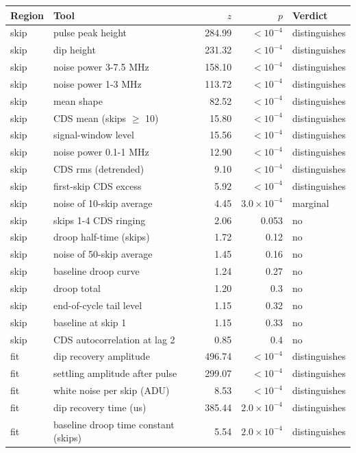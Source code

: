 \documentclass[11pt]{article}
\begin{document}
\begin{center}
\small
\begin{tabular}{llrrl}
\toprule
Region & Tool & $z$ & $p$ & Verdict \\
\midrule
skip & pulse peak height & 284.99 & $<10^{-4}$ & distinguishes \\
skip & dip height & 231.32 & $<10^{-4}$ & distinguishes \\
skip & noise power 3-7.5 MHz & 158.10 & $<10^{-4}$ & distinguishes \\
skip & noise power 1-3 MHz & 113.72 & $<10^{-4}$ & distinguishes \\
skip & mean shape & 82.52 & $<10^{-4}$ & distinguishes \\
skip & CDS mean (skips $\ge$ 10) & 15.80 & $<10^{-4}$ & distinguishes \\
skip & signal-window level & 15.56 & $<10^{-4}$ & distinguishes \\
skip & noise power 0.1-1 MHz & 12.90 & $<10^{-4}$ & distinguishes \\
skip & CDS rms (detrended) & 9.10 & $<10^{-4}$ & distinguishes \\
skip & first-skip CDS excess & 5.92 & $<10^{-4}$ & distinguishes \\
skip & noise of 10-skip average & 4.45 & $3.0\times10^{-4}$ & marginal \\
skip & skips 1-4 CDS ringing & 2.06 & 0.053 & no \\
skip & droop half-time (skips) & 1.72 & 0.12 & no \\
skip & noise of 50-skip average & 1.45 & 0.16 & no \\
skip & baseline droop curve & 1.24 & 0.27 & no \\
skip & droop total & 1.20 & 0.3 & no \\
skip & end-of-cycle tail level & 1.15 & 0.32 & no \\
skip & baseline at skip 1 & 1.15 & 0.33 & no \\
skip & CDS autocorrelation at lag 2 & 0.85 & 0.4 & no \\
fit & dip recovery amplitude & 496.74 & $<10^{-4}$ & distinguishes \\
fit & settling amplitude after pulse & 299.07 & $<10^{-4}$ & distinguishes \\
fit & white noise per skip (ADU) & 8.53 & $<10^{-4}$ & distinguishes \\
fit & dip recovery time (us) & 385.44 & $2.0\times10^{-4}$ & distinguishes \\
fit & baseline droop time constant (skips) & 5.54 & $2.0\times10^{-4}$ & distinguishes \\

\end{tabular}
\end{center}
\end{document}
